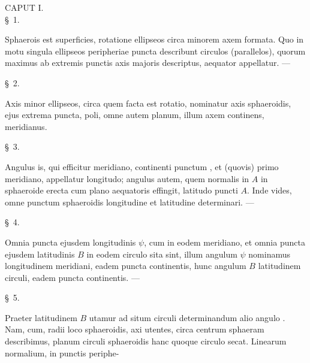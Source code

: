 \begin{center}
{\large CAPUT I.}\\[0.8em]
\S\ 1.
\end{center}

Sphaerois est superficies, rotatione ellipseos circa minorem axem  formata. Quo in motu singula ellipseos peripheriae puncta describunt circulos (parallelos), quorum maximus ab extremis punctis axis majoris  descriptus, aequator appellatur. ---

\begin{center}\S\ 2.\end{center}
Axis minor ellipseos, circa quem facta est rotatio, nominatur axis sphaeroidis, ejus extrema puncta, poli, omne autem planum, illum axem continens, meridianus.

\begin{center}\S\ 3.\end{center}
Angulus \gq{$\psi$} is, qui efficitur meridiano, continenti punctum , et (quovis) primo meridiano, appellatur longitudo; angulus  autem, quem normalis in $A$ in sphaeroide erecta cum plano aequatoris effingit, latitudo puncti $A$. Inde vides, omne punctum sphaeroidis longitudine et latitudine determinari. ---

\begin{center}\S\ 4.\end{center}
Omnia puncta ejusdem longitudinis $\psi$, cum in eodem meridiano, et omnia puncta ejusdem latitudinis $B$ in eodem circulo sita sint, illum angulum $\psi$ nominamus longitudinem meridiani, eadem puncta continentis, hunc angulum $B$ latitudinem circuli, eadem puncta continentis. ---

\begin{center}\S\ 5.\end{center}
Praeter latitudinem $B$ utamur ad situm circuli determinandum alio angulo . Nam, cum, radii loco sphaeroidis, axi  utentes, circa centrum sphaeram describimus, planum circuli sphaeroidis hanc quoque circulo secat. Linearum normalium, in punctis periphe-
